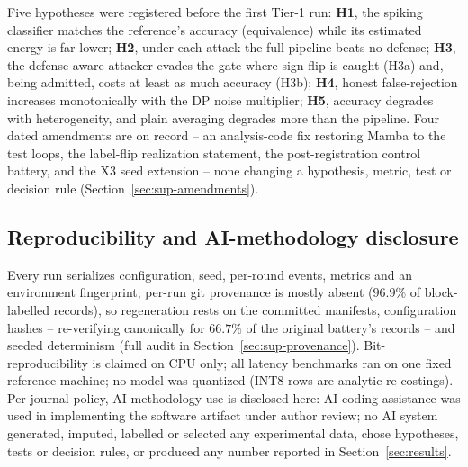 Five hypotheses were registered before the first Tier-1 run: \textbf{H1},
the spiking classifier matches the reference's accuracy (equivalence)
while its estimated energy is far lower; \textbf{H2}, under each attack
the full pipeline beats no defense; \textbf{H3}, the defense-aware
attacker evades the gate where sign-flip is caught (H3a) and, being
admitted, costs at least as much accuracy (H3b); \textbf{H4}, honest
false-rejection increases monotonically with the DP noise multiplier;
\textbf{H5}, accuracy degrades with heterogeneity, and plain averaging
degrades more than the pipeline. Four dated amendments are on record --
an analysis-code fix restoring Mamba to the test loops, the label-flip
realization statement, the post-registration control battery, and the X3
seed extension -- none changing a hypothesis, metric, test or decision
rule (Section~\ref{sec:sup-amendments}).

\subsection{Reproducibility and AI-methodology disclosure}
\label{sec:design-repro}
\label{sec:ai-methodology}

Every run serializes configuration, seed, per-round events, metrics and
an environment fingerprint; per-run git provenance is mostly absent
($96.9\%$ of block-labelled records), so regeneration rests on the
committed manifests, configuration hashes -- re-verifying canonically for
$66.7\%$ of the original battery's records -- and seeded determinism
(full audit in Section~\ref{sec:sup-provenance}). Bit-reproducibility is
claimed on CPU only; all latency benchmarks ran on one fixed reference
machine; no model was quantized (INT8 rows are analytic re-costings).
Per journal policy, AI methodology use is disclosed here: AI coding
assistance was used in implementing the software artifact under author
review; no AI system generated, imputed, labelled or selected any
experimental data, chose hypotheses, tests or decision rules, or produced
any number reported in Section~\ref{sec:results}.
